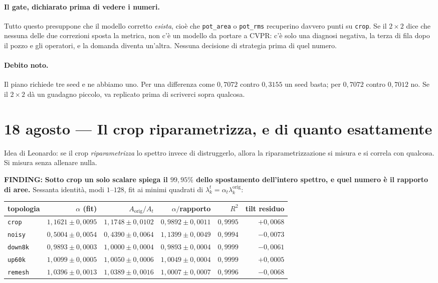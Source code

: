 \documentclass[11pt,a4paper]{article}
\newcommand{\finding}[1]{\textcolor{finding}{\textbf{FINDING:}} #1}
\begin{document}
\paragraph{Il gate, dichiarato prima di vedere i numeri.} Tutto questo presuppone che il modello
corretto \emph{esista}, cio\`e che \texttt{pot\_area} o \texttt{pot\_rms} recuperino davvero
punti su \texttt{crop}. Se il $2\times2$ dice che nessuna delle due correzioni sposta la metrica,
non c'\`e un modello da portare a CVPR: c'\`e solo una diagnosi negativa, la terza di fila dopo
il pozzo e gli operatori, e la domanda diventa un'altra. Nessuna decisione di strategia prima di
quel numero.

\paragraph{Debito noto.} Il piano richiede tre seed e ne abbiamo uno. Per una differenza come
$0{,}7072$ contro $0{,}3155$ un seed basta; per $0{,}7072$ contro $0{,}7012$ no. Se il $2\times2$
d\`a un guadagno piccolo, va replicato prima di scriverci sopra qualcosa.


\section{18 agosto --- Il crop riparametrizza, e di quanto esattamente}

Idea di Leonardo: se il crop \emph{riparametrizza} lo spettro invece di distruggerlo, allora la
riparametrizzazione si misura e si correla con qualcosa. Si misura senza allenare nulla.

\finding{\textbf{Sotto crop un solo scalare spiega il $99{,}95\%$ dello spostamento dell'intero
spettro, e quel numero \`e il rapporto di aree.} Sessanta identit\`a, modi $1$--$128$, fit ai
minimi quadrati di $\lambda^t_k = \alpha_t \lambda^{\mathrm{orig}}_k$:}

\begin{center}\small
\begin{tabular}{lrrrrr}
\toprule
topologia & $\alpha$ (fit) & $A_{\mathrm{orig}}/A_t$ & $\alpha/$rapporto & $R^2$ & tilt residuo \\
\midrule
\texttt{crop}   & $1{,}1621 \pm 0{,}0095$ & $1{,}1748 \pm 0{,}0102$ & $0{,}9892 \pm 0{,}0011$ & $0{,}9995$ & $+0{,}0068$ \\
\texttt{noisy}  & $0{,}5004 \pm 0{,}0054$ & $0{,}4390 \pm 0{,}0064$ & $1{,}1399 \pm 0{,}0049$ & $0{,}9994$ & $-0{,}0073$ \\
\texttt{down8k} & $0{,}9893 \pm 0{,}0003$ & $1{,}0000 \pm 0{,}0004$ & $0{,}9893 \pm 0{,}0004$ & $0{,}9999$ & $-0{,}0061$ \\
\texttt{up60k}  & $1{,}0099 \pm 0{,}0005$ & $1{,}0050 \pm 0{,}0006$ & $1{,}0049 \pm 0{,}0004$ & $0{,}9999$ & $+0{,}0005$ \\
\texttt{remesh} & $1{,}0396 \pm 0{,}0013$ & $1{,}0389 \pm 0{,}0016$ & $1{,}0007 \pm 0{,}0007$ & $0{,}9996$ & $-0{,}0068$ \\
\bottomrule
\end{tabular}
\end{center}
\end{document}
